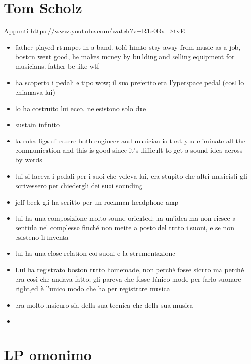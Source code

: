 \documentclass[class=book, crop=false, oneside, 12pt]{standalone}
\begin{document}
\section{Tom Scholz}
Appunti \url{https://www.youtube.com/watch?v=R1c0Bx_StvE}

\begin{itemize}
    \item  father played rtumpet in a band. told himto stay away from music as a job, boston went good, he makes money by building and selling equipment for musicians. father be like wtf
    \item ha scoperto i pedali e tipo wow; il suo preferito era l'yperspace pedal (così lo chiamava lui)
    \item lo ha costruito lui ecco, ne esistono solo due
    \item sustain infinito
    \item la roba figa di essere both engineer and musician is that you eliminate all the communication and this is good since it's difficult to get a sound idea across by words
    \item lui si faceva i pedali per i suoi che voleva lui, era stupito che altri musicisti gli scrivessero per chiedergli dei suoi sounding
    \item jeff beck gli ha scritto per un rockman headphone amp
    \item lui ha una composizione molto sound-oriented: ha un'idea ma non riesce a sentirla nel complesso finché non mette a posto del tutto i suoni, e se non esistono li inventa
    \item lui ha una close relation coi suoni e la strumentazione
    \item Lui ha registrato boston tutto homemade, non perché fosse sicuro ma perché era così che andava fatto; gli pareva che fosse lúnico modo per farlo suonare right,ed è l'unico modo che ha per registrare musica
    \item era molto insicuro sia della sua tecnica che della sua musica
    \item 
\end{itemize}

\section{LP omonimo}
\end{document}
